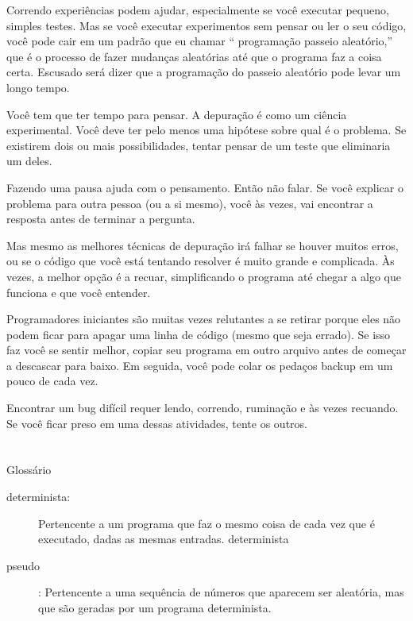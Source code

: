 \documentclass[10pt]{book}
\begin{document}
\begin{v erbatim}
{Correndo experiências podem ajudar, especialmente se você executar pequeno, simples
testes. Mas se você executar experimentos sem pensar ou ler o seu
código, você pode cair em um padrão que eu chamar `` programação passeio aleatório,''
que é o processo de fazer mudanças aleatórias até que o programa
faz a coisa certa. Escusado será dizer que a programação do passeio aleatório
pode levar um longo tempo.

Você tem que ter tempo para pensar. A depuração é como um
ciência experimental. Você deve ter pelo menos uma hipótese sobre
qual é o problema. Se existirem dois ou mais possibilidades, tentar
pensar de um teste que eliminaria um deles.

Fazendo uma pausa ajuda com o pensamento. Então não falar.
Se você explicar o problema para outra pessoa (ou a si mesmo), você
às vezes, vai encontrar a resposta antes de terminar a pergunta.

Mas mesmo as melhores técnicas de depuração irá falhar se houver muitos
erros, ou se o código que você está tentando resolver é muito grande e
complicada. Às vezes, a melhor opção é a recuar, simplificando o
programa até chegar a algo que funciona e que você
entender.

Programadores iniciantes são muitas vezes relutantes a se retirar porque
eles não podem ficar para apagar uma linha de código (mesmo que seja errado).
Se isso faz você se sentir melhor, copiar seu programa em outro arquivo
antes de começar a descascar para baixo. Em seguida, você pode colar os pedaços
backup em um pouco de cada vez.

Encontrar um bug difícil requer lendo, correndo, ruminação e
às vezes recuando. Se você ficar preso em uma dessas atividades,
tente os outros.


\section{} Glossário

\begin{description}

\item[determinista:] Pertencente a um programa que faz o mesmo
coisa de cada vez que é executado, dadas as mesmas entradas.
\index{} determinista

\item[pseudo]: Pertencente a uma sequência de números que aparecem
ser aleatória, mas que são geradas por um programa determinista.


\end{description}}
\end{v erbatim}
\end{document}
